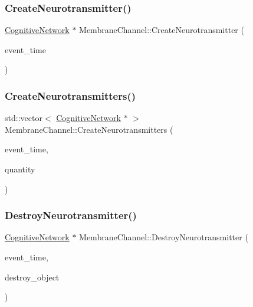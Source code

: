 \subsubsection{\texorpdfstring{Create\+Neurotransmitter()}{CreateNeurotransmitter()}}
{\footnotesize\ttfamily \mbox{\hyperlink{classCognitiveNetwork}{Cognitive\+Network}} $\ast$ Membrane\+Channel\+::\+Create\+Neurotransmitter (\begin{DoxyParamCaption}\item[{std\+::chrono\+::time\+\_\+point$<$ \mbox{\hyperlink{universe_8h_a0ef8d951d1ca5ab3cfaf7ab4c7a6fd80}{Clock}} $>$}]{event\+\_\+time }\end{DoxyParamCaption})}

\mbox{\label{classMembraneChannel_a24c791e6cfd906d49e0ceb8a24eeb4cb}} 
\subsubsection{\texorpdfstring{Create\+Neurotransmitters()}{CreateNeurotransmitters()}}
{\footnotesize\ttfamily std\+::vector$<$ \mbox{\hyperlink{classCognitiveNetwork}{Cognitive\+Network}} $\ast$ $>$ Membrane\+Channel\+::\+Create\+Neurotransmitters (\begin{DoxyParamCaption}\item[{std\+::chrono\+::time\+\_\+point$<$ \mbox{\hyperlink{universe_8h_a0ef8d951d1ca5ab3cfaf7ab4c7a6fd80}{Clock}} $>$}]{event\+\_\+time,  }\item[{int}]{quantity }\end{DoxyParamCaption})}

\mbox{\label{classMembraneChannel_a985d8f93077b0f93daa9c311a22917a1}} 
\subsubsection{\texorpdfstring{Destroy\+Neurotransmitter()}{DestroyNeurotransmitter()}}
{\footnotesize\ttfamily \mbox{\hyperlink{classCognitiveNetwork}{Cognitive\+Network}} $\ast$ Membrane\+Channel\+::\+Destroy\+Neurotransmitter (\begin{DoxyParamCaption}\item[{std\+::chrono\+::time\+\_\+point$<$ \mbox{\hyperlink{universe_8h_a0ef8d951d1ca5ab3cfaf7ab4c7a6fd80}{Clock}} $>$}]{event\+\_\+time,  }\item[{\mbox{\hyperlink{classCognitiveNetwork}{Cognitive\+Network}} $\ast$}]{destroy\+\_\+object }\end{DoxyParamCaption})}

